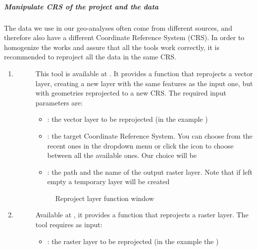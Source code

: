 \documentclass[letterpaper,10pt,english]{sphinxmanual}
\begin{document}
\subparagraph{Manipulate CRS of the project and the data}
\label{\detokenize{preparation/preparation:manipulate-crs-of-the-project-and-the-data}}
The data we use in our geo-analyses often come from different sources, and therefore also have a different Coordinate Reference System (CRS).
In order to homogenize the works and assure that all the tools work correctly, it is recommended to reproject all the data in the same CRS.
\begin{enumerate}
\def\theenumi{\arabic{enumi}}
\def\labelenumi{\theenumi .}
\makeatletter\def\p@enumii{\p@enumi \theenumi .}\makeatother
\item {} \begin{description}
\item[{}] \leavevmode
This tool is available at . It provides a function that reprojects a vector layer, creating a new
layer with the same features as the input one, but with geometries reprojected to a new CRS.
The required input parameters are:
\begin{itemize}
\item {} 
: the vector layer to be reprojected (in the example )

\item {} 
: the target Coordinate Reference System. You can choose from the
recent ones in the dropdown menu or click the icon to choose between all the available ones. Our choice will be

\item {} 
: the path and the name of the output raster layer. Note that if left empty a temporary layer will be created

\end{itemize}

\begin{figure}[htbp]
\centering
\capstart

\noindent{}
\caption{Reproject layer function window}\label{\detokenize{preparation/preparation:id5}}\end{figure}

\end{description}

\item {} \begin{description}
\item[{}] \leavevmode
Available at , it provides a function that reprojects a raster layer. The tool requires as input:
\begin{itemize}
\item {} 
: the raster layer to be reprojected (in the example the )


\end{itemize}
\end{description}
\end{enumerate}
\end{document}
